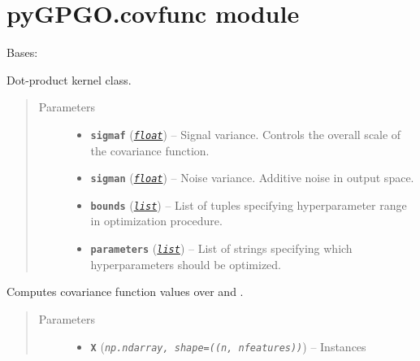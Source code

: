 \documentclass[letterpaper,10pt,english]{sphinxmanual}
\begin{document}
\section{pyGPGO.covfunc module}
\label{pyGPGO.covfunc:pygpgo-covfunc-module}\label{pyGPGO.covfunc::doc}\label{pyGPGO.covfunc:module-pyGPGO.covfunc}

\begin{fulllineitems}
\label{pyGPGO.covfunc:pyGPGO.covfunc.dotProd}
Bases: \href{https://docs.python.org/2/library/functions.html\#object}{}

Dot-product kernel class.
\begin{quote}\begin{description}
\item[{Parameters}] \leavevmode\begin{itemize}
\item {} 
\textbf{\texttt{sigmaf}} (\href{https://docs.python.org/2/library/functions.html\#float}{\emph{\texttt{float}}}) -- Signal variance. Controls the overall scale of the covariance function.

\item {} 
\textbf{\texttt{sigman}} (\href{https://docs.python.org/2/library/functions.html\#float}{\emph{\texttt{float}}}) -- Noise variance. Additive noise in output space.

\item {} 
\textbf{\texttt{bounds}} (\href{https://docs.python.org/2/library/functions.html\#list}{\emph{\texttt{list}}}) -- List of tuples specifying hyperparameter range in optimization procedure.

\item {} 
\textbf{\texttt{parameters}} (\href{https://docs.python.org/2/library/functions.html\#list}{\emph{\texttt{list}}}) -- List of strings specifying which hyperparameters should be optimized.

\end{itemize}

\end{description}\end{quote}

\begin{fulllineitems}
\label{pyGPGO.covfunc:pyGPGO.covfunc.dotProd.K}
Computes covariance function values over  and .
\begin{quote}\begin{description}
\item[{Parameters}] \leavevmode\begin{itemize}
\item {} 
\textbf{\texttt{X}} (\emph{\texttt{np.ndarray, shape=((n, nfeatures))}}) -- Instances


\end{itemize}
\end{description}
\end{quote}
\end{fulllineitems}
\end{fulllineitems}
\end{document}
